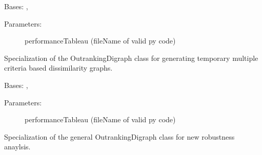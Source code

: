 \documentclass[letterpaper,10pt,english]{sphinxmanual}
\begin{document}

\begin{fulllineitems}
\label{techDoc:outrankingDigraphs.MultiCriteriaDissimilarityDigraph}
Bases: {\hyperref[techDoc:outrankingDigraphs.OutrankingDigraph]{}}, {\hyperref[techDoc:perfTabs.PerformanceTableau]{}}
\begin{description}
\item[{Parameters:}] \leavevmode
performanceTableau (fileName of valid py code)

\end{description}

Specialization of the OutrankingDigraph class for generating
temporary multiple criteria based dissimilarity graphs.

\end{fulllineitems}


\begin{fulllineitems}
\label{techDoc:outrankingDigraphs.NewRobustOutrankingDigraph}
Bases: {\hyperref[techDoc:outrankingDigraphs.BipolarOutrankingDigraph]{}}, {\hyperref[techDoc:perfTabs.PerformanceTableau]{}}
\begin{description}
\item[{Parameters:}] \leavevmode
performanceTableau (fileName of valid py code)

\end{description}

Specialization of the general OutrankingDigraph class for 
new robustness anaylsis.

\end{fulllineitems}

\end{document}
